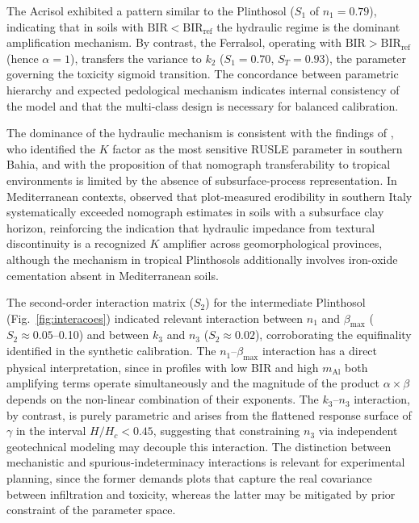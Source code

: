 \documentclass[pdflatex,sn-basic,referee,lineno]{sn-jnl}
\begin{document}
The Acrisol exhibited a pattern similar to the Plinthosol ($S_1$ of $n_1 = 0.79$), indicating that in soils with $\mathrm{BIR} < \mathrm{BIR_{ref}}$ the hydraulic regime is the dominant amplification mechanism. By contrast, the Ferralsol, operating with $\mathrm{BIR} > \mathrm{BIR_{ref}}$ (hence $\alpha = 1$), transfers the variance to $k_2$ ($S_1 = 0.70$, $S_T = 0.93$), the parameter governing the toxicity sigmoid transition. The concordance between parametric hierarchy and expected pedological mechanism indicates internal consistency of the model and that the multi-class design is necessary for balanced calibration.

The dominance of the hydraulic mechanism is consistent with the findings of \citet{francois_et_al_2024}, who identified the $K$ factor as the most sensitive RUSLE parameter in southern Bahia, and with the proposition of \citet{alewell_et_al_2019} that nomograph transferability to tropical environments is limited by the absence of subsurface-process representation. In Mediterranean contexts, \citet{bagarello_et_al_2012} observed that plot-measured erodibility in southern Italy systematically exceeded nomograph estimates in soils with a subsurface clay horizon, reinforcing the indication that hydraulic impedance from textural discontinuity is a recognized $K$ amplifier across geomorphological provinces, although the mechanism in tropical Plinthosols additionally involves iron-oxide cementation absent in Mediterranean soils.

The second-order interaction matrix ($S_2$) for the intermediate Plinthosol (Fig.~\ref{fig:interacoes}) indicated relevant interaction between $n_1$ and $\beta_{\max}$ ($S_2 \approx 0.05$--0.10) and between $k_3$ and $n_3$ ($S_2 \approx 0.02$), corroborating the equifinality identified in the synthetic calibration. The $n_1$--$\beta_{\max}$ interaction has a direct physical interpretation, since in profiles with low BIR and high $m_{\mathrm{Al}}$ both amplifying terms operate simultaneously and the magnitude of the product $\alpha \times \beta$ depends on the non-linear combination of their exponents. The $k_3$--$n_3$ interaction, by contrast, is purely parametric and arises from the flattened response surface of $\gamma$ in the interval $H/H_c < 0.45$, suggesting that constraining $n_3$ via independent geotechnical modeling may decouple this interaction. The distinction between mechanistic and spurious-indeterminacy interactions is relevant for experimental planning, since the former demands plots that capture the real covariance between infiltration and toxicity, whereas the latter may be mitigated by prior constraint of the parameter space.
\end{document}
